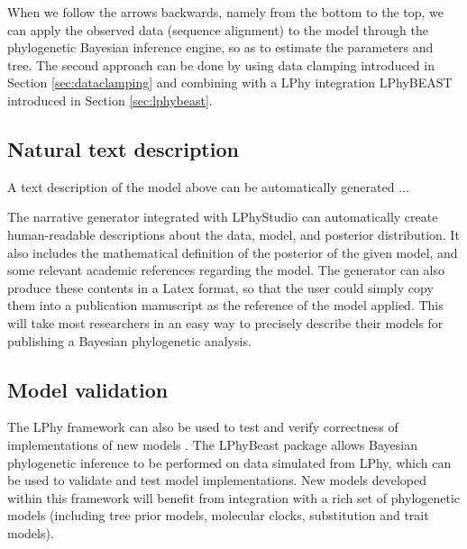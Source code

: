 \documentclass[10pt,letterpaper,table]{article}
\begin{document}
{When we follow the arrows backwards, namely from the bottom to the top, we can apply the observed data (sequence alignment) to the model through the phylogenetic Bayesian inference engine, so as to estimate the parameters and tree\cite{hohna2014probabilistic}. 
The second approach can be done by using data clamping introduced in Section \ref{sec:dataclamping} and combining with a LPhy integration LPhyBEAST introduced in Section \ref{sec:lphybeast}.

\subsection{Natural text description}
A text description of the model above can be automatically generated ... 

The narrative generator integrated with LPhyStudio can automatically create human-readable descriptions about the data, model, and posterior distribution. 
It also includes the mathematical definition of the posterior of the given model, and some relevant academic references regarding the model. 
The generator can also produce these contents in a Latex format, so that the user could simply copy them into a publication manuscript as the reference of the model applied. 
This will take most researchers in an easy way to precisely describe their models for publishing a Bayesian phylogenetic analysis. 


\subsection{Model validation}
The LPhy framework can also be used to test and verify correctness of implementations of new models \cite{chen2022accounting}. 
The LPhyBeast package allows Bayesian phylogenetic inference to be performed on data simulated from LPhy, which can be used to validate and test model implementations. 
New models developed within this framework will benefit from integration with a rich set of phylogenetic models (including tree prior models, molecular clocks, substitution and trait models). 


}
\end{document}
